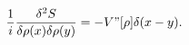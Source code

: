 \begin{equation}
\frac{1}{i} \frac {\delta^2 S}{\delta \rho(x) \delta \rho (y)}= - V"[\rho]
\delta(x-y).
\end{equation}

